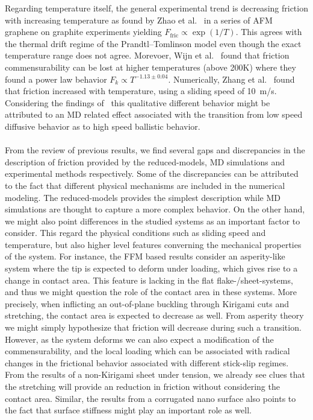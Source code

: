 Regarding temperature itself, the general experimental trend is decreasing friction with increasing temperature as found by Zhao et al.~\cite{zhao_thermally_2007} in a series of \acrshort{AFM} graphene on graphite experiments yielding $F_{\text{fric}} \propto \exp{(1/T)}$. This agrees with the thermal drift regime of the Prandtl–Tomlinson model even though the exact temperature range does not agree. Morevoer, Wijn et al.~\cite{Wijn_2011} found that friction commensurability can be lost at higher temperatures (above 200K) where they found a power law behavior $F_k \propto T^{-1.13 \pm0.04}$. Numerically, Zhang et al.~\cite{ma12091425} found that friction increased with temperature, using a sliding speed of \SI{10}{m/s}. Considering the findings of~\cite{Guerra_2010} this qualitative different behavior might be attributed to an \acrshort{MD} related effect associated with the transition from low speed diffusive behavior as to high speed ballistic behavior.
\\
\\
From the review of previous results, we find several gaps and discrepancies in
the description of friction provided by the reduced-models, \acrshort{MD}
simulations and experimental methods respectively. Some of the discrepancies can
be attributed to the fact that different physical mechanisms are included in the
numerical modeling. The reduced-models provides the simplest description while
\acrshort{MD} simulations are thought to capture a more complex behavior. On the
other hand, we might also point differences in the studied systems as an
important factor to consider. This regard the physical conditions such as
sliding speed and temperature, but also higher level features converning the
mechanical properties of the system. For instance, the \acrshort{FFM} based
results consider an asperity-like system where the tip is expected to deform
under loading, which gives rise to a change in contact area. This feature is
lacking in the flat flake-/sheet-systems, and thus we might question the role of
the contact area in these systems. More precisely, when inflicting an
out-of-plane buckling through Kirigami cuts and stretching, the contact area is
expected to decrease as well. From asperity theory we might simply hypothesize
that friction will decrease during such a transition. However, as the system
deforms we can also expect a modification of the commensurability, and the local loading which can be associated with radical changes in the frictional behavior associated with different stick-slip regimes. From the results of a non-Kirigami sheet under tension, we already see clues that the stretching will provide an reduction in friction without considering the contact area. Similar, the results from a corrugated nano surface also points to the fact that surface stiffness might play an important role as well. 








